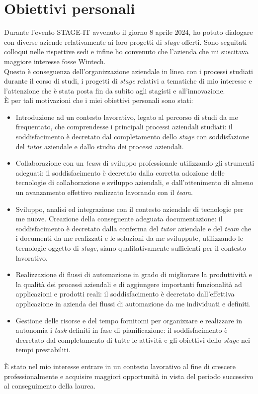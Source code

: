 \section{Obiettivi personali}
Durante l'evento STAGE-IT avvenuto il giorno 8 aprile 2024, ho potuto dialogare con diverse aziende relativamente ai loro progetti di \emph{stage} offerti. Sono seguitati colloqui nelle rispettive sedi e infine ho convenuto che l'azienda che mi suscitava maggiore interesse fosse Wintech.\\
Questo è conseguenza dell'organizzazione aziendale in linea con i processi studiati durante il corso di studi, i progetti di \emph{stage} relativi a tematiche di mio interesse e l'attenzione che è stata posta fin da subito agli stagisti e all'innovazione.\\
È per tali motivazioni che i miei obiettivi personali sono stati:
\begin{itemize}
    \item Introduzione ad un contesto lavorativo, legato al percorso di studi da me frequentato, che comprendesse i principali processi aziendali studiati: il soddisfacimento è decretato dal completamento dello \emph{stage} con soddisfazione del \emph{tutor} aziendale e dallo studio dei processi aziendali. 
    \item Collaborazione con un \emph{team} di sviluppo professionale utilizzando gli strumenti adeguati: il soddisfacimento è decretato dalla corretta adozione delle tecnologie di collaborazione e sviluppo aziendali, e dall'ottenimento di almeno un avanzamento effettivo realizzato lavorando con il \emph{team}. 
    \item Sviluppo, analisi ed integrazione con il contesto aziendale di tecnologie per me nuove. Creazione della conseguente adeguata documentazione: il soddisfacimento è decretato dalla conferma del \emph{tutor} aziendale e del \emph{team} che i documenti da me realizzati e le soluzioni da me sviluppate, utilizzando le tecnologie oggetto di \emph{stage}, siano qualitativamente sufficienti per il contesto lavorativo. 
    \item Realizzazione di flussi di automazione in grado di migliorare la produttività e la qualità dei processi aziendali e di aggiungere importanti funzionalità ad applicazioni e prodotti reali: il soddisfacimento è decretato dall'effettiva applicazione in azienda dei flussi di automazione da me individuati e definiti. 
    \item Gestione delle risorse e del tempo fornitomi per organizzare e realizzare in autonomia i \emph{task} definiti in fase di pianificazione: il soddisfacimento è decretato dal completamento di tutte le attività e gli obiettivi dello \emph{stage} nei tempi prestabiliti.\\
\end{itemize}
È stato nel mio interesse entrare in un contesto lavorativo al fine di crescere professionalmente e acquisire maggiori opportunità in vista del periodo successivo al conseguimento della laurea. 
 
 
